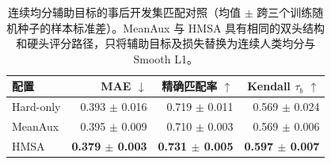 \begin{table}[H]
\centering
\caption{连续均分辅助目标的事后开发集匹配对照（均值 $\pm$ 跨三个训练随机种子的样本标准差）。MeanAux 与 HMSA 具有相同的双头结构和硬头评分路径，只将辅助目标及损失替换为连续人类均分与 Smooth L1。}
\label{tab:dev_meanaux_summary}
\small
\begin{tabular}{lrrr}
\toprule
配置 & MAE $\downarrow$ & 精确匹配率 $\uparrow$ & Kendall $\tau_b$ $\uparrow$ \\
\midrule
Hard-only & 0.393 $\pm$ 0.016 & 0.719 $\pm$ 0.011 & 0.569 $\pm$ 0.024 \\
MeanAux & 0.395 $\pm$ 0.009 & 0.710 $\pm$ 0.003 & 0.569 $\pm$ 0.006 \\
HMSA & \textbf{0.379 $\pm$ 0.003} & \textbf{0.731 $\pm$ 0.005} & \textbf{0.597 $\pm$ 0.007} \\
\bottomrule
\end{tabular}
\end{table}
